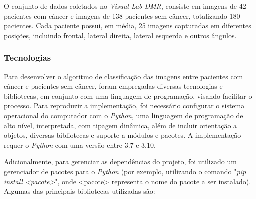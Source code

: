 O conjunto de dados coletados no \textit{Visual Lab DMR}, consiste em imagens de 42 pacientes com câncer e imagens de 138 pacientes sem câncer, totalizando 180 pacientes. Cada paciente possui, em média, 25 imagens capturadas em diferentes posições, incluindo frontal, lateral direita, lateral esquerda e outros ângulos.



\subsubsection{\esp Tecnologias} \label{techs}
Para desenvolver o algoritmo de classificação das imagens entre pacientes com câncer e pacientes sem câncer, foram empregadas diversas tecnologias e bibliotecas, em conjunto com uma linguagem de programação, visando facilitar o processo. Para reproduzir a implementação, foi necessário configurar o sistema operacional do computador com o \textit{Python}, uma linguagem de programação de alto nível, interpretada, com tipagem dinâmica, além de incluir orientação a objetos, diversas bibliotecas e suporte a módulos e pacotes. A implementação requer o \textit{Python} com uma versão entre 3.7 e 3.10.


Adicionalmente, para gerenciar as dependências do projeto, foi utilizado um gerenciador de pacotes para o \textit{Python} (por exemplo, utilizando o comando "\textit{pip install <pacote>}", onde <pacote> representa o nome do pacote a ser instalado). Algumas das principais bibliotecas utilizadas são:

